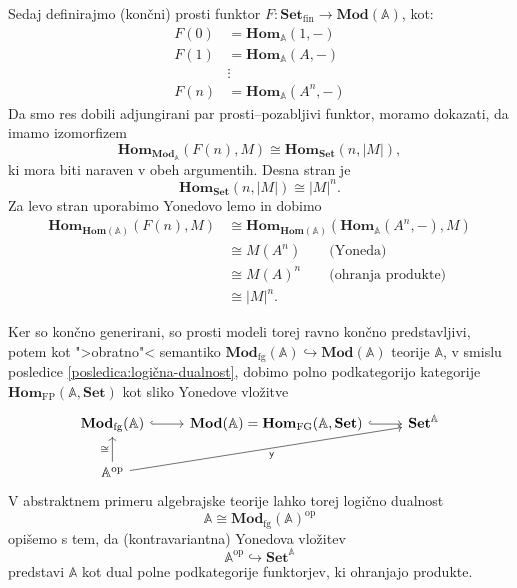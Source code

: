 \documentclass[../kategoricna_logika.tex]{subfiles}
\begin{document}
Sedaj definirajmo (končni) prosti funktor \(F : \mathbf{Set}_{ \mathrm{fin}} \to \mathbf{Mod}(\mathbb{A})\), 
kot:
\begin{align*}
F(0) &= \mathbf{Hom}_{\mathbb{A}}(1,-) \\
F(1) &= \mathbf{Hom}_{\mathbb{A}}(A,-) \\
&\vdots \\
F(n) &= \mathbf{Hom}_{\mathbb{A}}(A^n, -)
\end{align*}
Da smo res dobili adjungirani par prosti--pozabljivi funktor, moramo dokazati, da
imamo izomorfizem
\[ \mathbf{Hom}_{\mathbf{Mod}_{\mathbb{A}}}(F(n), M) \cong \mathbf{Hom}_{\mathbf{Set}}(n, |M|), \]
ki mora biti naraven v obeh argumentih. Desna stran je 
\[\mathbf{Hom}_{\mathbf{Set}}(n, |M|) \cong |M|^n. \]
Za levo stran uporabimo Yonedovo lemo in dobimo
\begin{align*}
\mathbf{Hom}_{\mathbf{Hom}(\mathbb{A})}(F(n),M) &\cong  \mathbf{Hom}_{\mathbf{Hom}(\mathbb{A})}(\mathbf{Hom}_{\mathbb{A}}(A^n, -), M) \\
&\cong M(A^n) \qquad \text{(Yoneda)} \\
&\cong M(A)^n \qquad \text{(ohranja produkte)} \\
&\cong |M|^n.
\end{align*}

Ker so končno generirani, so prosti modeli torej ravno končno predstavljivi, potem
kot ">obratno"< semantiko
\(\mathbf{Mod}_{\mathrm{fg}}(\mathbb{A}) \hookrightarrow \mathbf{Mod}(\mathbb{A})\)
teorije \(\mathbb{A}\), v smislu posledice \ref{posledica:logična-dualnost},
dobimo polno podkategorijo kategorije
\(\mathbf{Hom}_{\mathrm{FP}}(\mathbb{A}, \mathbf{Set})\) kot sliko Yonedove vložitve
\begin{equation*}
\begin{tikzcd}
\mathbf{Mod}_{\mathrm{fg}}(\mathbb{A}) \ar[r, hook] & \mathbf{Mod}(\mathbb{A}) = \mathbf{Hom}_{\mathrm{FG}}(\mathbb{A}, \mathbf{Set}) \ar[r, hook] & \mathbf{Set}^{\mathbb{A}} \\
\mathbb{A}^{\mathrm{op}} \ar[u, "\cong"] \ar[urr, "\mathsf{y}"']
\end{tikzcd}
\end{equation*}
V abstraktnem primeru algebrajske teorije lahko torej logično dualnost
\[ \mathbb{A} \cong \mathbf{Mod}_{\mathrm{fg}}(\mathbb{A})^{\mathrm{op}} \]
opišemo s tem, da (kontravariantna) Yonedova vložitev
\[ \mathbb{A}^{\mathrm{op}} \hookrightarrow \mathbf{Set}^{\mathbb{A}} \]
predstavi \(\mathbb{A}\) kot dual polne podkategorije funktorjev, ki ohranjajo produkte.
%
\end{document}
